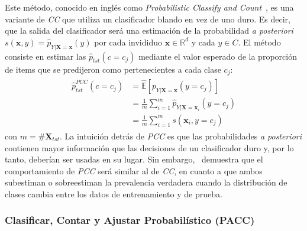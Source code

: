 Este método, conocido en inglés como {\it Probabilistic Classify and
Count\/}~\cite{bella2010quantification, tang2010network}, es una variante de
{\it CC\/} que utiliza un clasificador blando en vez de uno duro. Es decir, que
la salida del clasificador será una estimación de la probabilidad {\it a
posteriori\/} $s(\boldsymbol{x}, y) = \hat
p_{Y|\boldsymbol{X}=\boldsymbol{x}}(y)$ por cada invididuo $\boldsymbol{x} \in
\mathbb{R}^d$ y cada $y \in C$. El método consiste en estimar las $\hat
p_{tst}(c=c_j)$ mediante el valor esperado de la proporción de items que se
predijeron como pertenecientes a cada clase $c_j$:
\begin{align}
\begin{split}
    \hat p^{PCC}_{tst}(c=c_j) &= \mathbb{\hat E}[p_{Y|\boldsymbol{X}=\boldsymbol{x}}(y=c_j)] \\
    &= \frac{1}{m} \sum \limits_{i=1}^{m}{\hat p_{Y|\boldsymbol{X}=\boldsymbol{x}_i}(y=c_j)} \\
    &= \frac{1}{m} \sum \limits_{i=1}^{m}{s(\boldsymbol{x}_i, y=c_j)}
\end{split}
\end{align}
con $m=\#\boldsymbol{X}_{tst}$. La intuición detrás de {\it PCC\/} es que las
probabilidades {\it a posteriori\/} contienen mayor información que las
decisiones de un clasificador duro y, por lo tanto, deberían ser usadas en su
lugar. Sin embargo,~\citet[Corolario 6, p. 157 y p.163]{tasche2014exact}
demuestra que el comportamiento de {\it PCC\/} será similar al de {\it CC}, en
cuanto a que ambos subestiman o sobreestiman la prevalencia verdadera cuando la
distribución de clases cambia entre los datos de entrenamiento y de prueba.

\subsubsection{Clasificar, Contar y Ajustar Probabilístico (PACC)}

